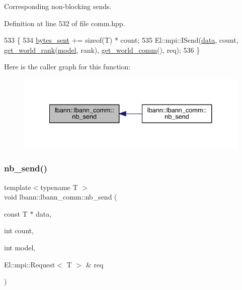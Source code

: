 Corresponding non-\/blocking sends. 

Definition at line 532 of file comm.\+hpp.


\begin{DoxyCode}
533                                      \{
534     \hyperlink{classlbann_1_1lbann__comm_ad1f146ae7337ece6266fd307944928e0}{bytes\_sent} += \textcolor{keyword}{sizeof}(T) * count;
535     El::mpi::ISend(\hyperlink{namespacelbann_1_1cnpy__utils_a9ac86d96ccb1f8b4b2ea16441738781f}{data}, count, \hyperlink{classlbann_1_1lbann__comm_ab3b1ebe8b72575094405eb2e37bb447d}{get\_world\_rank}(\hyperlink{namespacelbann_adee41f31f15f3906cbdcce4a1417eb56a20f35e630daf44dbfa4c3f68f5399d8c}{model}, rank), 
      \hyperlink{classlbann_1_1lbann__comm_a0493f1f0c42b95674daacf5288fdb073}{get\_world\_comm}(), req);
536   \}
\end{DoxyCode}
Here is the caller graph for this function\+:\nopagebreak
\begin{figure}[H]
\begin{center}
\leavevmode
\includegraphics[width=334pt]{classlbann_1_1lbann__comm_a70679ca6477c56972f9bc53d52e5ce21_icgraph}
\end{center}
\end{figure}
\mbox{\label{classlbann_1_1lbann__comm_a6d9de11c64685e0983b196044856d281}} 
\subsubsection{\texorpdfstring{nb\+\_\+send()}{nb\_send()}\hspace{0.1cm}{\footnotesize\ttfamily [2/6]}}
{\footnotesize\ttfamily template$<$typename T $>$ \\
void lbann\+::lbann\+\_\+comm\+::nb\+\_\+send (\begin{DoxyParamCaption}\item[{const T $\ast$}]{data,  }\item[{int}]{count,  }\item[{int}]{model,  }\item[{El\+::mpi\+::\+Request$<$ T $>$ \&}]{req }\end{DoxyParamCaption})\hspace{0.3cm}{\ttfamily [inline]}}



